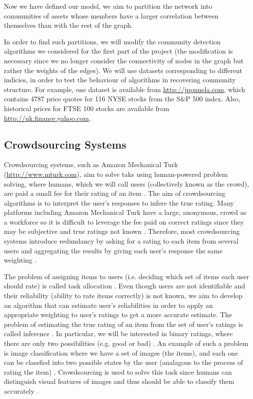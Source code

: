 \documentclass[12pt]{article}
\numberwithin{equation}{section}
\begin{document}
Now we have defined our model, we aim to partition the network into communities of assets whose members have a larger correlation between themselves than with the rest of the graph.

In order to find such partitions, we will modify the community detection algorithms we considered for the first part of the project (the modification is necessary since we no longer consider the connectivity of nodes in the graph but rather the weights of the edges). We will use datasets corresponding to different indicies, in order to test the behaviour of algorithms in recovering community structure. For example, one dataset is available from \url{http://jponnela.com}, which contains 4787 price quotes for 116 NYSE stocks from the S\&P 500 index. Also, historical prices for FTSE 100 stocks are available from \url{http://uk.finance.yahoo.com}.

\subsection{Crowdsourcing Systems}
\label{subsec:crowdsourcingSystems}

Crowdsourcing systems, such as Amazon Mechanical Turk (\url{http://www.mturk.com}), aim to solve taks using human-powered problem solving, where humans, which we will call users (collectively known as the crowd), are paid a small fee for their rating of an item \cite{KOS13,EHR12}. The aim of crowdsourcing algorithms is to interpret the user's responses to infere the true rating. Many platforms including Amazon Mechanical Turk have a large, anonymous, crowd as a workforce so it is difficult to leverage the fee paid on correct ratings since they may be subjective and true ratings not known \cite{KOS13}. Therefore, most crowdsourcing systems introduce redundancy by asking for a rating to each item from several users and aggregating the results by giving each user's response the same weighting \cite{GKM11,KOS13,DDK+13}.

The problem of assigning items to users (i.e. deciding which set of items each user should rate) is called task allocation \cite{KOS13}. Even though users are not identifiable and their reliability (ability to rate items correctly) is not known, we aim to develop an algorithm that can estimate user's reliabilities in order to apply an appropriate weighting to user's ratings to get a more accurate estimate. The problem of estimating the true rating of an item from the set of user's ratings is called inference \cite{KOS13}. In particular, we will be interested in binary ratings, where there are only two possibilities (e.g. good or bad) \cite{GKM11}. An example of such a problem is image classification where we have a set of images (the items), and each one can be classfied into two possible states by the user (analagous to the process of rating the item) \cite{KOS13, DKF13}. Crowdsourcing is used to solve this task since humans can distinguish visual features of images and thus should be able to classify them accurately \cite{DKF13}.
\end{document}
